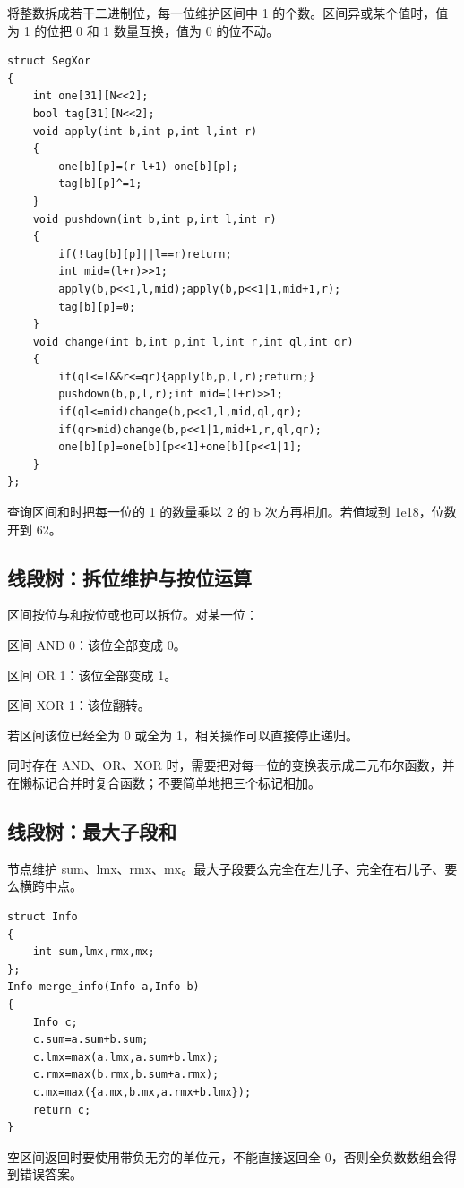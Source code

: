 将整数拆成若干二进制位，每一位维护区间中 1 的个数。区间异或某个值时，值为 1 的位把 0 和 1 数量互换，值为 0 的位不动。

\begin{verbatim}
struct SegXor
{
    int one[31][N<<2];
    bool tag[31][N<<2];
    void apply(int b,int p,int l,int r)
    {
        one[b][p]=(r-l+1)-one[b][p];
        tag[b][p]^=1;
    }
    void pushdown(int b,int p,int l,int r)
    {
        if(!tag[b][p]||l==r)return;
        int mid=(l+r)>>1;
        apply(b,p<<1,l,mid);apply(b,p<<1|1,mid+1,r);
        tag[b][p]=0;
    }
    void change(int b,int p,int l,int r,int ql,int qr)
    {
        if(ql<=l&&r<=qr){apply(b,p,l,r);return;}
        pushdown(b,p,l,r);int mid=(l+r)>>1;
        if(ql<=mid)change(b,p<<1,l,mid,ql,qr);
        if(qr>mid)change(b,p<<1|1,mid+1,r,ql,qr);
        one[b][p]=one[b][p<<1]+one[b][p<<1|1];
    }
};
\end{verbatim}
查询区间和时把每一位的 1 的数量乘以 2 的 b 次方再相加。若值域到 1e18，位数开到 62。

\subsection{线段树：拆位维护与按位运算}

区间按位与和按位或也可以拆位。对某一位：

\par \noindent 区间 AND 0：该位全部变成 0。
\par \noindent 区间 OR 1：该位全部变成 1。
\par \noindent 区间 XOR 1：该位翻转。
\par \noindent 若区间该位已经全为 0 或全为 1，相关操作可以直接停止递归。

同时存在 AND、OR、XOR 时，需要把对每一位的变换表示成二元布尔函数，并在懒标记合并时复合函数；不要简单地把三个标记相加。

\subsection{线段树：最大子段和}

节点维护 sum、lmx、rmx、mx。最大子段要么完全在左儿子、完全在右儿子、要么横跨中点。

\begin{verbatim}
struct Info
{
    int sum,lmx,rmx,mx;
};
Info merge_info(Info a,Info b)
{
    Info c;
    c.sum=a.sum+b.sum;
    c.lmx=max(a.lmx,a.sum+b.lmx);
    c.rmx=max(b.rmx,b.sum+a.rmx);
    c.mx=max({a.mx,b.mx,a.rmx+b.lmx});
    return c;
}
\end{verbatim}
空区间返回时要使用带负无穷的单位元，不能直接返回全 0，否则全负数数组会得到错误答案。

